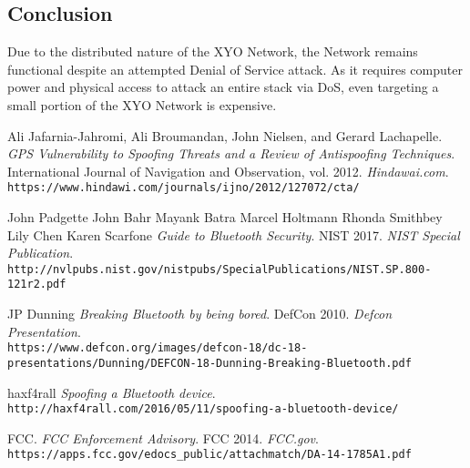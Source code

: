 \documentclass{article}
\begin{document}
\subsection{Conclusion}
Due to the distributed nature of the XYO Network, the Network remains functional despite an attempted Denial of Service attack. As it requires computer power and physical access to attack an entire stack via DoS, even targeting a small portion of the XYO Network is expensive.

\begin{thebibliography}{9}

Ali Jafarnia-Jahromi, Ali Broumandan, John Nielsen, and Gerard Lachapelle.
\textit{GPS Vulnerability to Spoofing Threats and a Review of Antispoofing Techniques}.
International Journal of Navigation and Observation, vol. 2012.
\textit{Hindawai.com}.
\\\texttt{https://www.hindawi.com/journals/ijno/2012/127072/cta/}

John Padgette John Bahr Mayank Batra Marcel Holtmann Rhonda Smithbey Lily Chen Karen Scarfone
\textit{Guide to Bluetooth Security}.
NIST 2017.
\textit{NIST Special Publication}.
\\\texttt{http://nvlpubs.nist.gov/nistpubs/SpecialPublications/NIST.SP.800-121r2.pdf}

JP Dunning
\textit{Breaking Bluetooth by being bored}.
DefCon 2010.
\textit{Defcon Presentation}.
\\\texttt{https://www.defcon.org/images/defcon-18/dc-18-presentations\-/Dunning/DEFCON-18-Dunning-Breaking-Bluetooth.pdf}

haxf4rall
\textit{Spoofing a Bluetooth device}.
\\\texttt{http://haxf4rall.com/2016/05/11/spoofing-a-bluetooth-device/}

FCC.
\textit{FCC Enforcement Advisory}.
FCC 2014.
\textit{FCC.gov}.
\\\texttt{https://apps.fcc.gov/edocs\_public/attachmatch/DA-14-1785A1.pdf}


\end{thebibliography}
\printglossaries

\end{document}
